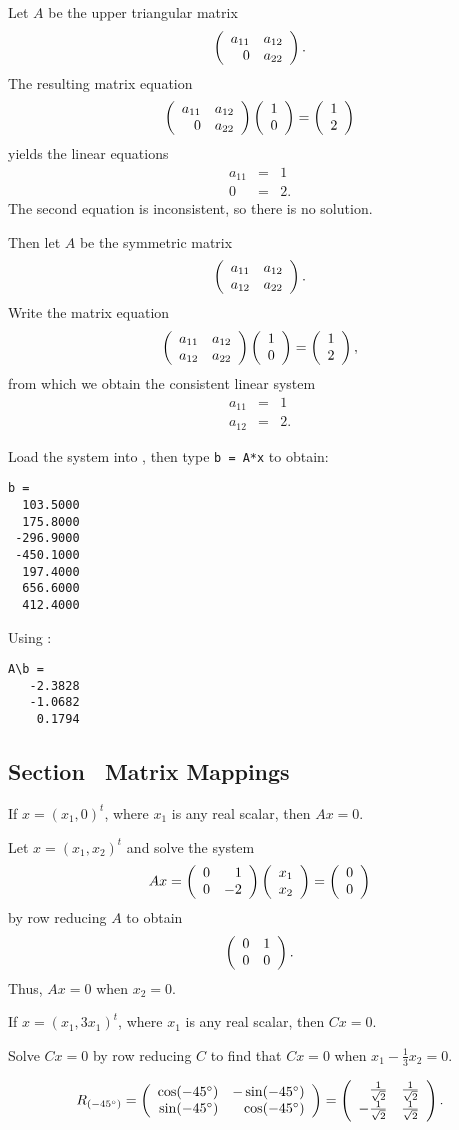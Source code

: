 \documentclass{ximera}
\begin{document}
\soln Let $A$ be the upper triangular matrix
\[ \left(\begin{array}{rr} a_{11} & a_{12}\\ 0 &a_{22}\end{array}\right). \]
The resulting matrix equation
\[ \left(\begin{array}{rr} a_{11} & a_{12}\\ 0 &a_{22}\end{array}\right)
\left(\begin{array}{r} 1 \\ 0\end{array}\right) = \left(\begin{array}{r} 1 \\ 2\end{array}\right) \]
yields the linear equations
\[ \begin{array}{rcl}
a_{11} & = & 1 \\
0 & = & 2.\end{array} \]
The second equation is inconsistent, so there is no solution.

\para Then let $A$ be the symmetric matrix
\[ \left(\begin{array}{rr} a_{11} & a_{12}\\ a_{12} &a_{22}\end{array}\right). \]
Write the matrix equation
\[ \left(\begin{array}{rr} a_{11} & a_{12}\\ a_{12} &a_{22}\end{array}\right)
\left(\begin{array}{r} 1 \\ 0\end{array}\right) = \left(\begin{array}{r} 1 \\ 2\end{array}\right), \]
from which we obtain the consistent linear system
\[ \begin{array}{rcl}
a_{11} & = & 1 \\
a_{12} & = & 2.\end{array} \]

 Load the system into \Matlabp, then type {\tt b = A*x}
to obtain:
\begin{verbatim}
b =
  103.5000
  175.8000
 -296.9000
 -450.1000
  197.4000
  656.6000
  412.4000
\end{verbatim}

 Using \Matlabp:
\begin{verbatim}
A\b =
   -2.3828
   -1.0682
    0.1794
\end{verbatim}



\subsection*{Section~\protect{\ref{s:4.2}} Matrix Mappings}

\ans If $x = (x_1,0)^t$, where $x_1$ is any real scalar, then $Ax = 0$.

\soln Let $x = (x_1,x_2)^t$ and solve the system
\[
Ax = \left(\begin{array}{rr} 0 & 1\\ 0 &-2\end{array}\right)\left(\begin{array}{r} x_1 \\ x_2\end{array}\right) = \left(\begin{array}{r} 0 \\ 0\end{array}\right)
\]
by row reducing $A$ to obtain
\[
\left(\begin{array}{rr} 0 & 1\\ 0 &0\end{array}\right).
\]
Thus, $Ax = 0$ when $x_2 = 0$.

\ans If $x = (x_1,3x_1)^t$, where $x_1$ is any real scalar, then $Cx = 0$.

\soln Solve $Cx = 0$ by row reducing $C$ to find that $Cx = 0$ when
$x_1 - \frac{1}{3}x_2 = 0$.

 \ans
\[
R_{(-45^\circ)} = \left(\begin{array}{rr} \cos (-45^\circ) & -\sin
(-45^\circ)\\ \sin (-45^\circ) &\cos (-45^\circ)\end{array}\right) =
\left(\begin{array}{rr} \frac{1}{\sqrt{2}} & \frac{1}{\sqrt{2}}\\ -\frac{1}{\sqrt{2}} &\frac{1}{\sqrt{2}}\end{array}\right).
\]
\end{document}

